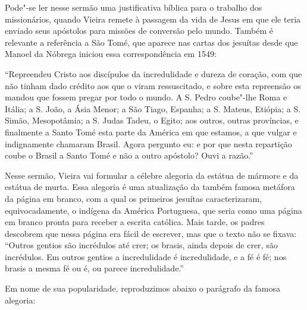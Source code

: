 Pode"-se ler nesse sermão uma justificativa bíblica para o trabalho dos
missionários, quando Vieira remete à passagem da vida de Jesus em que
ele teria enviado seus apóstolos para missões de conversão pelo mundo.
Também é relevante a referência a São Tomé, que aparece nas cartas dos
jesuítas desde que Manoel da Nóbrega iniciou essa correspondência em
1549:

``Repreendeu Cristo aos discípulos da incredulidade e dureza de coração,
com que não tinham dado crédito aos que o viram ressuscitado, e sobre
esta repreensão os mandou que fossem pregar por todo o mundo. A S. Pedro
coube"-lhe Roma e Itália; a S. João, a Ásia Menor; a São Tiago, Espanha;
a S. Mateus, Etiópia; a S. Simão, Mesopotâmia; a S. Judas Tadeu, o
Egito; aos outros, outras províncias, e finalmente a Santo Tomé esta
parte da América em que estamos, a que vulgar e indignamente chamaram
Brasil. Agora pergunto eu: e por que nesta repartição coube o Brasil a
Santo Tomé e não a outro apóstolo? Ouvi a razão.''

Nesse sermão, Vieira vai formular a célebre alegoria da estátua de
mármore e da estátua de murta. Essa alegoria é uma atualização da também
famosa metáfora da página em branco, com a qual os primeiros jesuítas
caracterizaram, equivocadamente, o indígena da América Portuguesa, que
seria como uma página em branco pronta para receber a escrita católica.
Mais tarde, os padres descobrem que nessa página era fácil de escrever,
mas que o texto não se fixava: ``Outros gentios são incrédulos até crer;
os brasis, ainda depois de crer, são incrédulos. Em outros gentios a
incredulidade é incredulidade, e a fé é fé; nos brasis a mesma fé ou é,
ou parece incredulidade.''

Em nome de sua popularidade, reproduzimos abaixo o parágrafo da famosa
alegoria:


